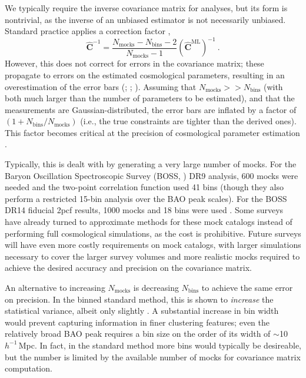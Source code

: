 \documentclass[modern]{aastex62}
\newcommand{\cf}{2pcf\xspace}
\newcommand{\inv}{^{-1}}
\newcommand{\hmpc}{$h^{-1}\,$Mpc}
\newcommand{\bld}[1]{\bm{#1}}
\newcommand{\NN}[1]{N_\mathrm{#1}}
\begin{document}
We typically require the inverse covariance matrix for analyses, but its form is nontrivial, as the inverse of an unbiased estimator is not necessarily unbiased.
Standard practice applies a correction factor \citep{Hartlap2007},
\begin{equation}
\bld{\hat{C}}\inv = \frac{\NN{mocks}-\NN{bins}-2}{\NN{mocks}-1} \left( \bld{\hat{C}}^\mathrm{ML} \right) \inv ~.
\end{equation}
However, this does not correct for errors in the covariance matrix; these propagate to errors on the estimated cosmological parameters, resulting in an overestimation of the error bars (\citealt{Hartlap2007}; \citealt{Dodelson2013} \citealt{Percival2014}; \citealt{TaylorJoachimi2014}).
Assuming that $\NN{mocks} >> \NN{bins}$ (with both much larger than the number of parameters to be estimated), and that the measurements are Gaussian-distributed, the error bars are inflated by a factor of $(1 + \NN{bins}/\NN{mocks})$ (i.e., the true constraints are tighter than the derived ones).
This factor becomes critical at the precision of cosmological parameter estimation \citep{Percival2014}.

Typically, this is dealt with by generating a very large number of mocks.
For the Baryon Oscillation Spectroscopic Survey (BOSS, \citealt{Dawson2013}) DR9 analysis, 600 mocks were needed and the two-point correlation function used 41 bins \citep{Sanchez2012} (though they also perform a restricted 15-bin analysis over the BAO peak scales). 
For the BOSS DR14 fiducial \cf results, 1000 mocks and 18 bins were used \cite{Ata2017}.
Some surveys have already turned to approximate methods for these mock catalogs instead of performing full cosmological simulations, as the cost is prohibitive.
Future surveys will have even more costly requirements on mock catalogs, with larger simulations necessary to cover the larger survey volumes and more realistic mocks required to achieve the desired accuracy and precision on the covariance matrix.

An alternative to increasing $\NN{mocks}$ is decreasing $\NN{bins}$ to achieve the same error on precision.
In the binned standard method, this is shown to \emph{increase} the statistical variance, albeit only slightly \citep{Percival2014}.
A substantial increase in bin width would prevent capturing information in finer clustering features; even the relatively broad BAO peak requires a bin size on the order of its width of $\sim$10\hmpc.
In fact, in the standard method more bins would typically be desireable, but the number is limited by the available number of mocks for covariance matrix computation.
\end{document}
